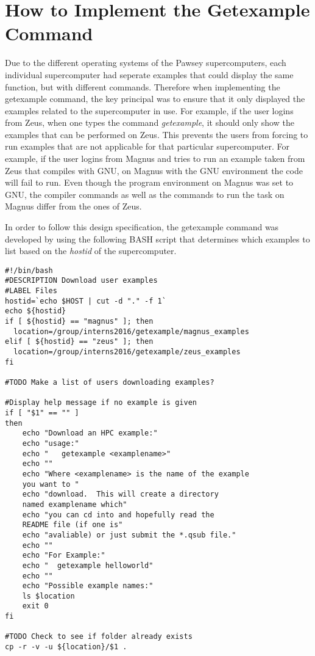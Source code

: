 \section{How to Implement the Getexample Command}

Due to the different operating systems of the Pawsey supercomputers, each individual supercomputer had seperate examples that could display the same
function, but with different commands. Therefore when implementing the getexample command, the key principal was to ensure that it only displayed the
examples related to the supercomputer in use. For example, if the user logins from Zeus, when one types the command \emph{getexample}, it should only
show the examples that can be performed on Zeus. This prevents the users from forcing to run examples that are not applicable for that particular 
supercomputer. For example, if the user logins from Magnus and tries to run an example taken from Zeus that compiles with GNU, on Magnus with the GNU 
environment the code will fail to run. Even though the program environment on Magnus was set to GNU, the compiler commands as well as the commands to
run the task on Magnus differ from the ones of Zeus.

In order to follow this design specification, the getexample command was developed by using the following BASH script that determines which examples to
list based on the \emph{hostid} of the supercomputer.    


\begin{tcolorbox}
\begin{Verbatim}[fontsize=\scriptsize]
#!/bin/bash
#DESCRIPTION Download user examples
#LABEL Files
hostid=`echo $HOST | cut -d "." -f 1`
echo ${hostid}
if [ ${hostid} == "magnus" ]; then 
  location=/group/interns2016/getexample/magnus_examples
elif [ ${hostid} == "zeus" ]; then
  location=/group/interns2016/getexample/zeus_examples
fi

#TODO Make a list of users downloading examples?

#Display help message if no example is given
if [ "$1" == "" ]
then
    echo "Download an HPC example:"
    echo "usage:"
    echo "   getexample <examplename>"
    echo ""
    echo "Where <examplename> is the name of the example 
    you want to "
    echo "download.  This will create a directory 
    named examplename which"
    echo "you can cd into and hopefully read the 
    README file (if one is"
    echo "avaliable) or just submit the *.qsub file."
    echo ""
    echo "For Example:"
    echo "  getexample helloworld"
    echo ""
    echo "Possible example names:"
    ls $location 
    exit 0
fi

#TODO Check to see if folder already exists
cp -r -v -u ${location}/$1 .
\end{Verbatim}
\end{tcolorbox}
